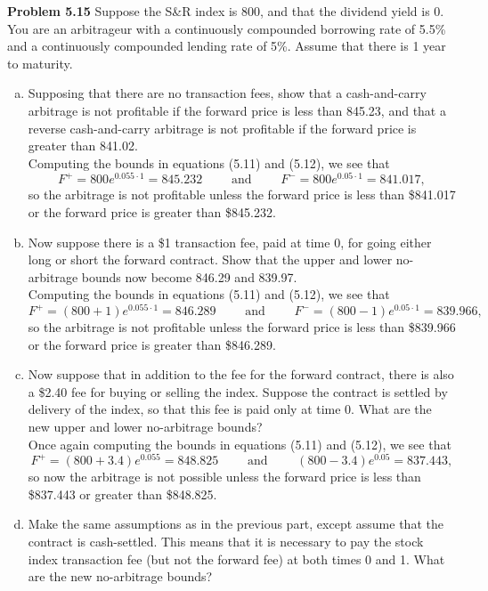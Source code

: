 \documentclass[12pt]{article}
\newcommand{\problem}[1]{\bigskip \noindent \textbf{Problem #1}}
\theoremstyle{plain}
\begin{document}
\problem{5.15} Suppose the S\&R index is 800, and that the dividend yield is 0. You are an arbitrageur with a continuously compounded borrowing rate of 5.5\% and a continuously compounded lending rate of 5\%. Assume that there is 1 year to maturity.
\begin{enumerate}[(a)]
\item Supposing that there are no transaction fees, show that a cash-and-carry arbitrage is not profitable if the forward price is less than 845.23, and that a reverse cash-and-carry arbitrage is not profitable if the forward price is greater than 841.02.\\

Computing the bounds in equations (5.11) and (5.12), we see that
\[
F^+ = 800e^{0.055\cdot1} = 845.232 \quad \quad \text{ and } \quad \quad F^- = 800e^{0.05\cdot 1} = 841.017,
\]
so the arbitrage is not profitable unless the forward price is less than \$841.017 or the forward price is greater than \$845.232.

\item Now suppose there is a \$1 transaction fee, paid at time 0, for going either long or short the forward contract. Show that the upper and lower no-arbitrage bounds now become 846.29 and 839.97.\\

Computing the bounds in equations (5.11) and (5.12), we see that
\[
F^+ = (800 + 1)e^{0.055\cdot 1} = 846.289 \quad \quad \text{ and } \quad \quad F^- = (800 - 1)e^{0.05 \cdot 1} = 839.966,
\]
so the arbitrage is not profitable unless the forward price is less than \$839.966 or the forward price is greater than \$846.289.

\item Now suppose that in addition to the fee for the forward contract, there is also a \$2.40 fee for buying or selling the index. Suppose the contract is settled by delivery of the index, so that this fee is paid only at time 0. What are the new upper and lower no-arbitrage bounds?\\

Once again computing the bounds in equations (5.11) and (5.12), we see that
\[
F^+ = (800 + 3.4)e^{0.055} = 848.825 \quad \quad \text{ and } \quad \quad (800 - 3.4)e^{0.05} = 837.443,
\]
so now the arbitrage is not possible unless the forward price is less than \$837.443 or greater than \$848.825.

\item Make the same assumptions as in the previous part, except assume that the contract is cash-settled. This means that it is necessary to pay the stock index transaction fee (but not the forward fee) at both times 0 and 1. What are the new no-arbitrage bounds?\\


\end{enumerate}
\end{document}
